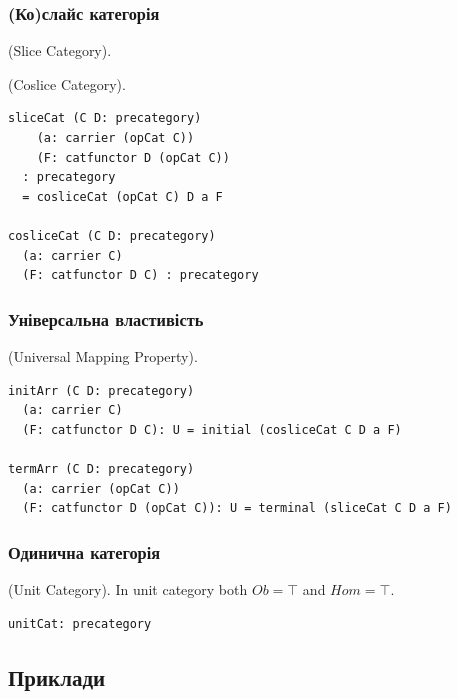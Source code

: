 \subsubsection{(Ко)слайс категорія}
\begin{definition} (Slice Category).
\end{definition}
\begin{definition} (Coslice Category).
\begin{lstlisting}
sliceCat (C D: precategory)
    (a: carrier (opCat C))
    (F: catfunctor D (opCat C))
  : precategory
  = cosliceCat (opCat C) D a F

cosliceCat (C D: precategory)
  (a: carrier C)
  (F: catfunctor D C) : precategory
\end{lstlisting}
\end{definition}

\subsubsection{Універсальна властивість}
\begin{definition} (Universal Mapping Property).
\begin{lstlisting}
initArr (C D: precategory)
  (a: carrier C)
  (F: catfunctor D C): U = initial (cosliceCat C D a F)

termArr (C D: precategory)
  (a: carrier (opCat C))
  (F: catfunctor D (opCat C)): U = terminal (sliceCat C D a F)
\end{lstlisting}
\end{definition}

\subsubsection{Одинична категорія}
\begin{definition} (Unit Category).
In unit category both $Ob = \top$ and $Hom = \top$.
\begin{lstlisting}
unitCat: precategory
\end{lstlisting}
\end{definition}

\subsection{Приклади}
